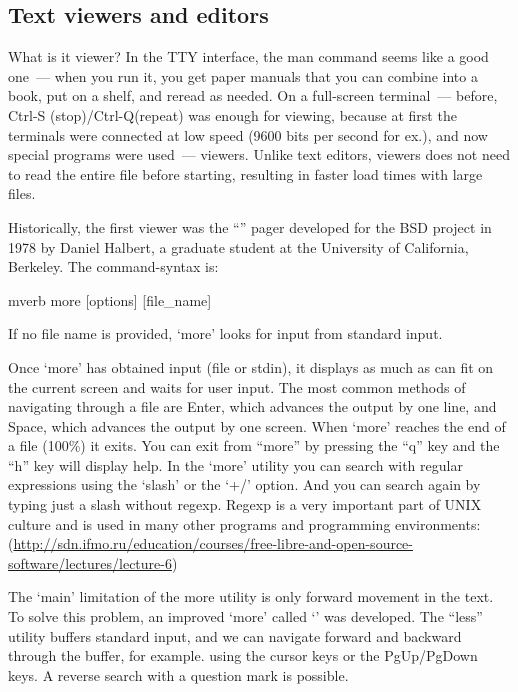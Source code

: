 \subsection*{Text viewers and editors}

What is it viewer? In the TTY interface, the man command seems like
a good one~--- when you run it, you get paper manuals that you can combine
into a book, put on a shelf, and reread as needed. On a full-screen terminal~---
before, Ctrl-S (stop)/Ctrl-Q(repeat) was enough for viewing, because at first
the terminals were connected at low speed (9600 bits per second for ex.),
and now special programs were used~--- viewers. Unlike text editors,
viewers does not need to read the entire file before starting, resulting in
faster load times with large files.

Historically, the first viewer was the ``'' pager developed for
the BSD project in 1978 by Daniel Halbert, a graduate student at the University
of California, Berkeley. The command-syntax is:
\begin{code}{mverb}
more [options] [file_name]
\end{code}
If no file name is provided, `more' looks for input from standard input.

Once `more' has obtained input (file or stdin), it displays as much as can fit
on the current screen and waits for user input. The most common methods of
navigating through a file are Enter, which advances the output by one line,
and Space, which advances the output by one screen.  When `more' reaches
the end of a file (100\%) it exits. You can exit from ``more'' by pressing
the ``q'' key and the ``h'' key will display help. In the `more' utility
you can search with regular expressions using the `slash' or the `+/' option.
And you can search again by typing just a slash without regexp.
Regexp is a very important part of UNIX culture and is used in many other
programs and programming environments:
(\url{http://sdn.ifmo.ru/education/courses/free-libre-and-open-source-software/lectures/lecture-6})

The `main' limitation of the more utility is only forward movement in the text.
To solve this problem, an improved `more' called `' was developed.
The ``less'' utility buffers standard input, and we can navigate forward and
backward through the buffer, for example. using the cursor keys or
the PgUp/PgDown keys. A reverse search with a question mark is possible.
